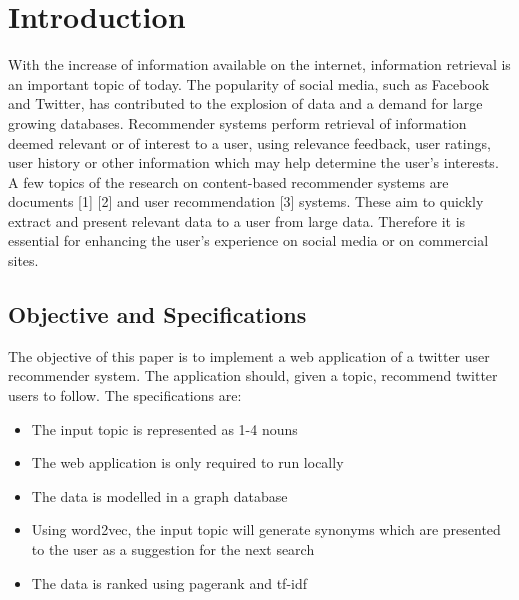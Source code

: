 \section{Introduction}
\label{sec:intro}

With the increase of information available on the internet, information retrieval is an important topic of today. The popularity of social media, such as Facebook and Twitter, has contributed to the explosion of data and a demand for large growing databases. Recommender systems perform retrieval of information deemed relevant or of interest to a user, using relevance feedback, user ratings, user history or other information which may help determine the user’s interests. A few topics of the research on content-based recommender systems are documents [1] [2] and user recommendation [3] systems. These aim to quickly extract and present relevant data to a user from large data. Therefore it is essential for enhancing the user’s experience on social media or on commercial sites.  

\subsection{Objective and Specifications}
The objective of this paper is to implement a web application of a twitter user recommender system. The application should, given a topic, recommend twitter users to follow. The specifications are:
\begin{itemize}
\item The input topic is represented as 1-4 nouns
\item The web application is only required to run locally
\item The data is modelled in a graph database
\item Using word2vec, the input topic will generate synonyms which are presented to the user as a suggestion for the next search
\item The data is ranked using pagerank and tf-idf
\end{itemize}


